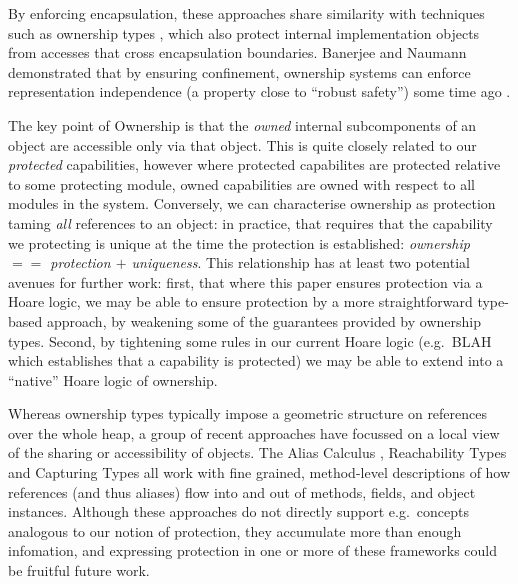 By enforcing encapsulation,  %
these approaches share similarity with techniques such as
ownership types \cite{ownalias,NobPotVitECOOP98}, which also
protect internal implementation objects from accesses that cross
encapsulation boundaries.  Banerjee and Naumann demonstrated that by
ensuring confinement, ownership
systems can enforce representation independence (a property close to
``robust safety'') some time ago \cite{Banerjee:2005}.


The key point of Ownership is that the \textit{owned} internal
subcomponents of an object are accessible only via that object.
This
is quite closely related to our \textit{protected} capabilities,
however where protected capabilites are protected relative to some
protecting module, owned capabilities are owned with respect to all
modules in the system.  Conversely, we can characterise ownership as
protection taming \textit{all} references to an object: in practice,
that requires that the capability we protecting is unique at the time
the protection is established: \textit{ownership $==$ protection $+$
  uniqueness}.  This relationship has at least two potential avenues
for further work: first, that where this paper ensures protection via
a Hoare logic, we may be able to ensure protection by a
more straightforward type-based approach, by weakening some of the
guarantees provided by ownership types.  Second,  by tightening some
rules in our current Hoare logic (e.g.\ BLAH which establishes that a
capability is protected) we may be able to extend into a ``native''
Hoare logic of ownership.



Whereas ownership types typically impose a geometric structure 
on references over the whole heap, a group of recent approaches have 
focussed on a local view of the sharing or accessibility of objects.
The Alias
Calculus \cite{meyer-alias-calculus-scp2015,meyer-auto-alias-sncs2020},
Reachability
Types \cite{romf-reachability-types-oopsla2021,rompf-poly-reachability-oopsla2024}
and Capturing
Types \cite{odersky-capturing-types-toplas2023,scoped-effects-oopsla2022,odersky-reach-prog2024}
all work with fine grained, method-level descriptions of how
references (and thus aliases) flow into and out of methods, fields,
and object instances. Although these approaches do not directly
support e.g.\ concepts analogous to our notion of protection,
they accumulate more than enough infomation, and expressing protection
in one or more of these frameworks could be fruitful future work.
